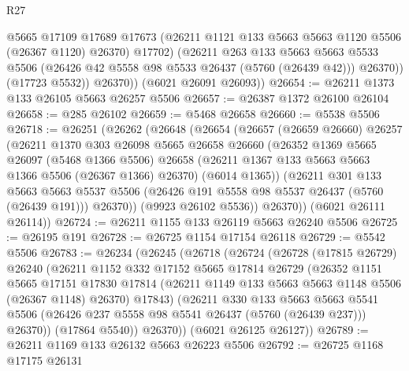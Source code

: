 \begin{lexlean}{R27}
\begin{coremodule}
                @5665
                @17109
                @17689
                @17673
                (@26211 @1121 @133 @5663 @5663 @1120 @5506 (@26367 @1120) @26370)
                @17702)
              (@26211
                @263
                @133
                @5663
                @5663
                @5533
                @5506
                (@26426 @42 @5558 @98 @5533 @26437 (@5760 (@26439 @42)))
                @26370))
            (@17723 @5532))
          @26370))
      (@6021 @26091 @26093))
@26654 := @26211 @1373 @133 @26105 @5663 @26257 @5506
@26657 := @26387 @1372 @26100 @26104
@26658 := @285 @26102
@26659 := @5468 @26658
@26660 := @5538 @5506
@26718 := @26251
    (@26262
      (@26648
        (@26654
          (@26657
            (@26659 @26660)
            @26257
            (@26211
              @1370
              @303
              @26098
              @5665
              @26658
              @26660
              (@26352
                @1369
                @5665
                @26097
                (@5468 @1366 @5506)
                @26658
                (@26211 @1367 @133 @5663 @5663 @1366 @5506 (@26367 @1366) @26370)
                (@6014 @1365))
              (@26211
                @301
                @133
                @5663
                @5663
                @5537
                @5506
                (@26426 @191 @5558 @98 @5537 @26437 (@5760 (@26439 @191)))
                @26370))
            (@9923 @26102 @5536))
          @26370))
      (@6021 @26111 @26114))
@26724 := @26211 @1155 @133 @26119 @5663 @26240 @5506
@26725 := @26195 @191
@26728 := @26725 @1154 @17154 @26118
@26729 := @5542 @5506
@26783 := @26234
    (@26245
      (@26718
        (@26724
          (@26728
            (@17815 @26729)
            @26240
            (@26211
              @1152
              @332
              @17152
              @5665
              @17814
              @26729
              (@26352
                @1151
                @5665
                @17151
                @17830
                @17814
                (@26211 @1149 @133 @5663 @5663 @1148 @5506 (@26367 @1148) @26370)
                @17843)
              (@26211
                @330
                @133
                @5663
                @5663
                @5541
                @5506
                (@26426 @237 @5558 @98 @5541 @26437 (@5760 (@26439 @237)))
                @26370))
            (@17864 @5540))
          @26370))
      (@6021 @26125 @26127))
@26789 := @26211 @1169 @133 @26132 @5663 @26223 @5506
@26792 := @26725 @1168 @17175 @26131

\end{coremodule}
\end{lexlean}
